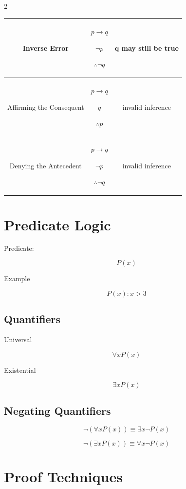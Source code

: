 \documentclass[9pt]{article}
\begin{document}
\begin{multicols}{2}
\begin{tabular}{|c|c|c|}
\hline

Inverse Error &
$p\rightarrow q$

$\neg p$

$\therefore \neg q$
&
q may still be true
\\

\hline

Affirming the Consequent &
$p\rightarrow q$

$q$

$\therefore p$
&
invalid inference
\\

\hline

Denying the Antecedent &
$p\rightarrow q$

$\neg p$

$\therefore \neg q$
&
invalid inference
\\

\hline
\end{tabular}

\section*{Predicate Logic}

Predicate:

\[
P(x)
\]

Example

\[
P(x): x>3
\]

\subsection*{Quantifiers}

Universal

\[
\forall x P(x)
\]

Existential

\[
\exists x P(x)
\]

\subsection*{Negating Quantifiers}

\[
\neg(\forall x P(x))\equiv \exists x \neg P(x)
\]

\[
\neg(\exists x P(x))\equiv \forall x \neg P(x)
\]

\section*{Proof Techniques}


\end{multicols}
\end{document}

